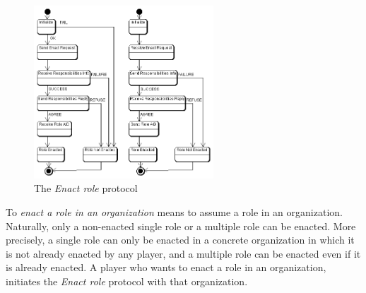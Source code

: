 \begin{figure}[ht]
	\centering
	\includegraphics[width=0.6\textwidth]{images/thespian/enact-role-protocol.png}
	\caption{The \textit{Enact role} protocol}
	\label{figure:thespian-enact-role-protocol}
\end{figure}

To \textit{enact a role in an organization} means to assume a role in an organization.
Naturally, only a non-enacted single role or a multiple role can be enacted.
More precisely, a single role can only be enacted in a concrete organization in which it is not already enacted by any player, and a multiple role can be enacted even if it is already enacted.
A player who wants to enact a role in an organization, initiates the \textit{Enact role} protocol with that organization.

